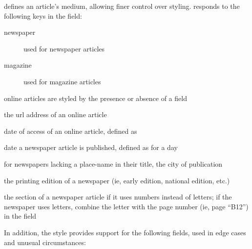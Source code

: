 \documentclass{ltxdockit}
\newcommand*{\Biblatexmla}{\sty{Biblatex-mla}\xspace}
\newenvironment*{optionslistNOT}
  {\list{}{%
     \setlength{\labelwidth}{\marglistwidth}%
     \setlength{\labelsep}{\marglistsep}%
     \setlength{\leftmargin}{50pt}%
     \renewcommand*{\makelabel}[1]{\hss\marglistfont##1}}%
   \def\optionitem##1{%
     \item[{\textbf{##1}}]}}
  {\endlist}
\begin{document}
\begin{optionslistNOT}
	
	\optionitem{entrysubtype} defines an article's medium, allowing finer control over styling. \Biblatexmla responds to the following keys in the  field:
	
	\begin{description}
		\item[newspaper] used for newspaper articles
		\item[magazine] used for magazine articles
	\end{description}
	
	online articles are styled by the presence or absence of a  field
	
	\optionitem{url} the url address of an online article
	
	\optionitem{urldate} date of access of an online article, defined as 
	
	\optionitem{date} date a newspaper article is published, defined as  for a day
	
	\optionitem{location} for newspapers lacking a place-name in their title, the city of publication
	
	\optionitem{version} the printing edition of a newspaper (ie, early edition, national edition, etc.)
	
	\optionitem{chapter} the section of a newspaper article if it uses numbers instead of letters; if the newspaper uses letters, combine the letter with the page number (ie, page ``B12'') in the  field
	
\end{optionslistNOT}

In addition, the style provides support for the following fields, used in edge cases and unusual circumstances:
\end{document}
